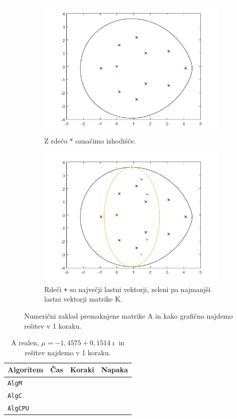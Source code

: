 \documentclass[12pt,a4paper]{amsart}
\theoremstyle{definition}
\theoremstyle{plain}
\begin{document}
\begin{figure}[H]
\begin{subfigure}[t]{0.5\textwidth}
\includegraphics[width=0.9\linewidth]{RC1.jpg}
\caption{Z rdečo $\ast$ označimo izhodišče.}
\label{fig:p31}
\end{subfigure}%
\hfill
\begin{subfigure}[t]{0.5\textwidth}
\includegraphics[width=0.9\linewidth]{RC1e.jpg}
\caption{Rdeči \verb~+~ so največji lastni vektorji, zeleni pa najmanjši lastni vektorji matrike K.}
\end{subfigure}
\caption{Numerični zaklad premaknjene matrike A in kako grafično najdemo rešitev v 1 koraku.}

\end{figure}

\begin{table}[H]
\begin{tabular}{|l|l|c|r|}
\hline
Algoritem & Čas & Koraki & Napaka\\
\hline
\hline
\verb+AlgM+ & & & \\
\hline
\verb+AlgC+ & & & \\
\hline
\verb+AlgCPU+ & & & \\
\hline
\end{tabular}
\caption{A realen, $\mu = -1,4575 + 0,1514 \imath$ in rešitev najdemo v 1 koraku.}
\label{t3}
\end{table}
\end{document}
